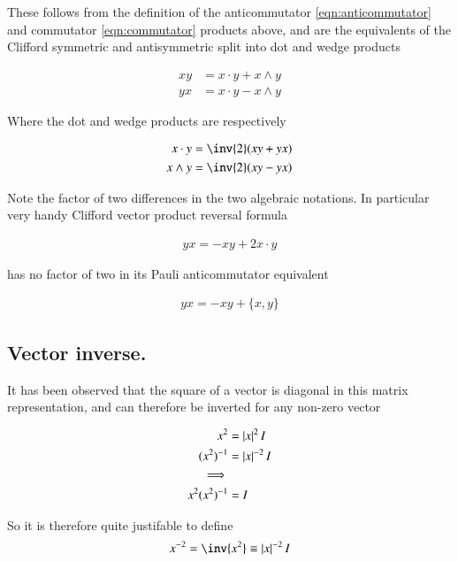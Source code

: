 \documentclass{article}
\newcommand{\symmetric}[2]{{\{{#1},{#2}\}}}
\begin{document}
These follows from the definition of the anticommutator 
\ref{eqn:anticommutator}
and commutator 
\ref{eqn:commutator}
products above, and are the equivalents of the Clifford symmetric and antisymmetric split into dot and wedge products

\begin{align}
x y &= {x} \cdot {y} + {x} \wedge {y} \\
y x &= {x} \cdot {y} - {x} \wedge {y}
\end{align}

Where the dot and wedge products are respectively

\begin{align*}
x \cdot y &= \inv{2}(x y + y x) \\
x \wedge y &= \inv{2}(x y - y x)
\end{align*}

Note the factor of two differences in the two algebraic notations.  In particular very handy Clifford vector product reversal formula

\begin{align*}
y x = - x y + 2 x \cdot y
\end{align*}

has no factor of two in its Pauli anticommutator equivalent

\begin{align}
y x = - x y + \symmetric{x}{y}
\end{align}

\subsection{ Vector inverse. }

It has been observed that the square of a vector is diagonal in this matrix representation, and can therefore be inverted for any non-zero vector

\begin{align*}
x^2 &= \left\lvert{x}\right\rvert^2 I \\
(x^2)^{-1} &= \left\lvert{x}\right\rvert^{-2} I \\
\implies \\
x^2 (x^2)^{-1} &= I \\
\end{align*}

So it is therefore quite justifable to define
\begin{align*}
x^{-2} = \inv{x^2} \equiv \Abs{x}^{-2} I \\
\end{align*}
\end{document}
